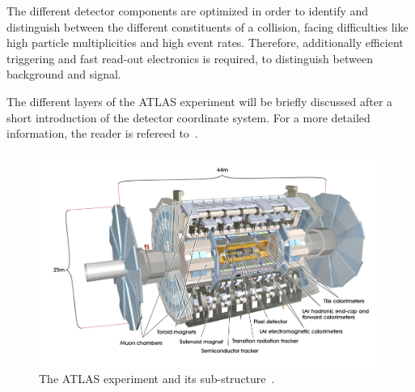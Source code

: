  The different detector components are optimized in order to identify and distinguish between the different constituents of a collision, facing difficulties like high particle multiplicities and high event rates. Therefore,  additionally  efficient triggering and fast read-out electronics is required, to distinguish between background and signal.

The different layers of the ATLAS experiment will be briefly discussed after a short introduction of the detector coordinate system. For a more detailed information, the reader is refereed to~\cite{Aad:2008zzm,ATLAS:1999uwa}.   


\begin{figure}[t]
	\centering
	\includegraphics[width=1.0\linewidth]{Pics/cp3/33}
	\caption{The ATLAS experiment and its sub-structure~\cite{Aad:2008zzm}.} 
	\label{fig:33}
\end{figure}



